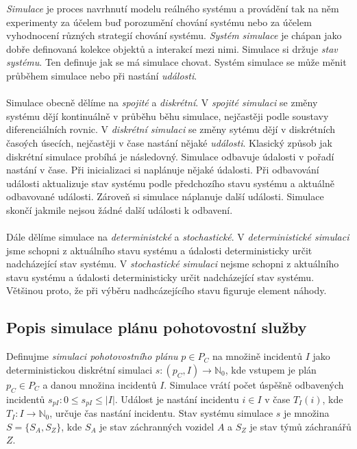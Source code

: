 \textit{Simulace} je proces navrhnutí modelu reálného systému a provádění tak na něm experimenty za účelem buď porozumění chování systému
nebo za účelem vyhodnocení různých strategií chování systému.
\textit{Systém simulace} je chápan jako dobře definovaná kolekce objektů a interakcí mezi nimi.
Simulace si držuje \textit{stav systému}. Ten definuje jak se má simulace chovat.
Systém simulace se může měnit průběhem simulace nebo při nastání \textit{události}.
\\
\\
Simulace obecně dělíme na \textit{spojité} a \textit{diskrétní}.
V \textit{spojité simulaci} se změny systému dějí kontinuálně v průběhu běhu simulace, nejčastěji podle soustavy diferenciálních rovnic.
V \textit{diskrétní simulaci} se změny sytému dějí v diskrétních časoých úsecích, nejčastěji v čase nastání nějaké \textit{události}.
Klasický způsob jak diskrétní simulace probíhá je následovný.
Simulace odbavuje údalosti v pořadí nastání v čase.
Při inicializaci si naplánuje nějaké údalosti.
Při odbavování události aktualizuje stav systému podle předchozího stavu systému a aktuálně odbavované události. Zároveň si simulace náplanuje další události. 
Simulace skončí jakmile nejsou žádné další události k odbavení.
\\
\\
Dále dělíme simulace na \textit{deterministcké} a \textit{stochastické}.
V \textit{deterministické simulaci} jsme schopni z aktuálního stavu systému a údalosti deterministicky určit nadcházející stav systému.
V \textit{stochastické simulaci} nejsme schopni z aktuálního stavu systému a údalosti deterministicky určit nadcházející stav systému.
Většinou proto, že při výběru nadhcázejícího stavu figuruje element náhody.
\cite{SimulaceBook}

\subsection{Popis simulace plánu pohotovostní služby}\label{definiceSimulace}

Definujme \textit{simulaci pohotovostního plánu} $p \in P_C$ na množině incidentů $I$ jako deterministickou diskrétní simulaci
$s \colon (p_C, I) \rightarrow \mathbb{N}_0$, kde vstupem je plán $p_C \in P_C$ a danou množina incidentů $I$.
Simulace vrátí počet úspěšně odbavených incidentů $s_{pI} \colon 0 \leq s_{pI} \leq |I|$.
Událost je nastání incidentu $i \in I$ v čase $T_I(i)$, kde $T_I \colon I \rightarrow \mathbb{N}_0$, určuje čas nastání incidentu.
Stav systému simulace $s$ je množina $S = \{ S_A, S_Z \}$, kde $S_A$ je stav záchranných vozidel $A$ a $S_Z$ je stav týmů záchranářů $Z$. 

